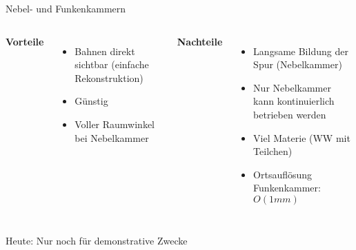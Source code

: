 \begin{frame}{Nebel- und Funkenkammern}
    \begin{columns}[T]
			\textbf{Vorteile}		
			\vspace{0.7cm}
			\begin{itemize}
			  \item Bahnen direkt sichtbar (einfache Rekonstruktion)
			  \item Günstig
			  \item Voller Raumwinkel bei Nebelkammer
			\end{itemize}	
	    	\textbf{Nachteile}
	    	\vspace{0.7cm}
	    	\begin{itemize}
			  \item Langsame Bildung der Spur (Nebelkammer)
			  \item Nur Nebelkammer kann kontinuierlich betrieben werden
			  \item Viel Materie (WW mit Teilchen)
			  \item Ortsauflösung Funkenkammer: $O(1 mm)$
			\end{itemize}
    \end{columns}
    \vspace{1cm}
    Heute: Nur noch für demonstrative Zwecke
\end{frame}